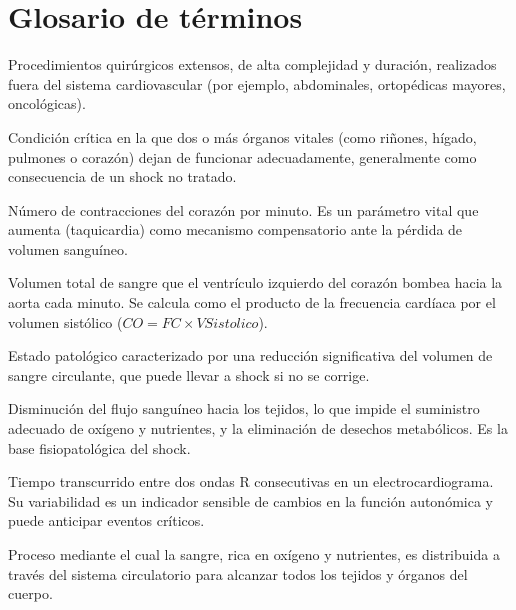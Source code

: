 \documentclass[12pt, letterpaper]{article}
\begin{document}
\section*{Glosario de términos}

\begin{description}[style=unboxed, leftmargin=0cm]
    \item[\textbf{Cirugía mayor no cardíaca:}] Procedimientos quirúrgicos extensos, de alta complejidad y duración, realizados fuera del sistema cardiovascular (por ejemplo, abdominales, ortopédicas mayores, oncológicas).
    
    \item[\textbf{Falla multiorgánica:}] Condición crítica en la que dos o más órganos vitales (como riñones, hígado, pulmones o corazón) dejan de funcionar adecuadamente, generalmente como consecuencia de un shock no tratado.
    
    \item[\textbf{Frecuencia cardíaca:}] Número de contracciones del corazón por minuto. Es un parámetro vital que aumenta (taquicardia) como mecanismo compensatorio ante la pérdida de volumen sanguíneo.
    
    \item[\textbf{Gasto cardíaco:}] Volumen total de sangre que el ventrículo izquierdo del corazón bombea hacia la aorta cada minuto. Se calcula como el producto de la frecuencia cardíaca por el volumen sistólico ($CO = FC \times VSistolico$).
    
    \item[\textbf{Hipovolemia:}] Estado patológico caracterizado por una reducción significativa del volumen de sangre circulante, que puede llevar a shock si no se corrige.
    
    \item[\textbf{Hipoperfusión tisular:}] Disminución del flujo sanguíneo hacia los tejidos, lo que impide el suministro adecuado de oxígeno y nutrientes, y la eliminación de desechos metabólicos. Es la base fisiopatológica del shock.
    
    \item[\textbf{Intervalo RR:}] Tiempo transcurrido entre dos ondas R consecutivas en un electrocardiograma. Su variabilidad es un indicador sensible de cambios en la función autonómica y puede anticipar eventos críticos.
    
    \item[\textbf{Perfusión tisular:}] Proceso mediante el cual la sangre, rica en oxígeno y nutrientes, es distribuida a través del sistema circulatorio para alcanzar todos los tejidos y órganos del cuerpo.
    

\end{description}
\end{document}
